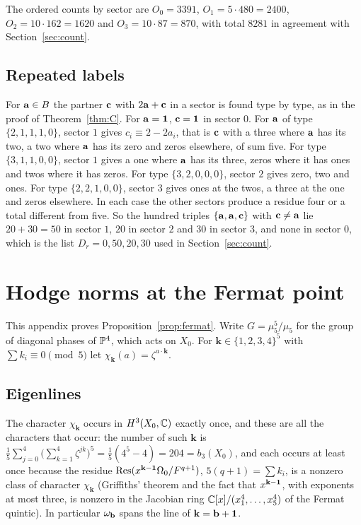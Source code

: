 The ordered counts by sector are $O_0=3391$, $O_1=5\cdot480=2400$,
$O_2=10\cdot162=1620$ and $O_3=10\cdot87=870$, with total $8281$ in
agreement with Section~\ref{sec:count}.

\subsection{Repeated labels}

For $\mathbf{a}\in B$ the partner $\mathbf{c}$ with $2\mathbf{a}+\mathbf{c}$ in a sector is found type
by type, as in the proof of Theorem~\ref{thm:C}. For $\mathbf{a}=\mathbf{1}$, $\mathbf{c}=\mathbf{1}$
in sector $0$. For $\mathbf{a}$ of type $\{2,1,1,1,0\}$, sector $1$ gives
$c_i\equiv2-2a_i$, that is $\mathbf{c}$ with a three where $\mathbf{a}$ has its two, a two
where $\mathbf{a}$ has its zero and zeros elsewhere, of sum five. For type
$\{3,1,1,0,0\}$, sector $1$ gives a one where $\mathbf{a}$ has its three, zeros
where it has ones and twos where it has zeros. For type $\{3,2,0,0,0\}$,
sector $2$ gives zero, two and ones. For type $\{2,2,1,0,0\}$, sector $3$
gives ones at the twos, a three at the one and zeros elsewhere. In each case
the other sectors produce a residue four or a total different from five.
So the hundred triples $\{\mathbf{a},\mathbf{a},\mathbf{c}\}$ with $\mathbf{c}\ne\mathbf{a}$ lie $20+30=50$ in
sector $1$, $20$ in sector $2$ and $30$ in sector $3$, and none in sector
$0$, which is the list $D_r=0,50,20,30$ used in Section~\ref{sec:count}.

\section{Hodge norms at the Fermat point}\label{app:fermat}

This appendix proves Proposition~\ref{prop:fermat}. Write
$G=\mu_5^5/\mu_5$ for the group of diagonal phases of $\mathbb{P}^4$, which acts
on $X_0$. For $\mathbf k\in\{1,2,3,4\}^5$ with $\sum k_i\equiv0\pmod5$ let
$\chi_{\mathbf k}(a)=\zeta^{a\cdot\mathbf k}$.

\subsection{Eigenlines}

The character $\chi_{\mathbf k}$ occurs in $H^3(X_0,\mathbb{C})$ exactly once, and
these are all the characters that occur: the number of such $\mathbf k$ is
$\frac15\sum_{j=0}^4\big(\sum_{k=1}^4\zeta^{jk}\big)^5=\frac15(4^5-4)=204
=b_3(X_0)$, and each occurs at least once because the residue
$\operatorname{Res}(x^{\mathbf k-\mathbf{1}}\Omega_0/F^{q+1})$, $5(q+1)=\sum k_i$, is a nonzero
class of character $\chi_{\mathbf k}$ (Griffiths' theorem and the fact that
$x^{\mathbf k-\mathbf{1}}$, with exponents at most three, is nonzero in the
Jacobian ring $\mathbb{C}[x]/(x_1^4,\dots,x_5^4)$ of the Fermat quintic). In
particular $\omega_{\mathbf{b}}$ spans the line of $\mathbf k=\mathbf{b}+\mathbf{1}$.

